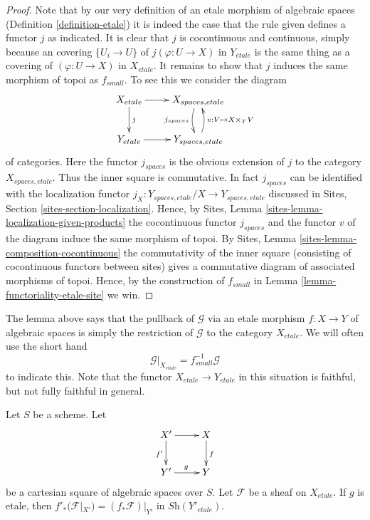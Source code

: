 \begin{proof}
Note that by our very definition of an etale morphism of algebraic spaces
(Definition \ref{definition-etale}) it is
indeed the case that the rule given defines a functor $j$ as indicated.
It is clear that $j$ is cocontinuous and continuous, simply because an
covering $\{U_i \to U\}$ of $j(\varphi : U \to X)$ in $Y_{etale}$ is the
same thing as a covering of $(\varphi : U \to X)$ in $X_{etale}$. It
remains to show that $j$ induces the same morphism of topoi as $f_{small}$.
To see this we consider the diagram
$$
\xymatrix{
X_{etale} \ar[r] \ar[d]^j &
X_{spaces, etale} \ar@/_/[d]_{j_{spaces}} \\
Y_{etale} \ar[r] &
Y_{spaces, etale} \ar@/_/[u]_{v : V \mapsto X \times_Y V}
}
$$
of categories. Here the functor $j_{spaces}$ is the obvious extension of $j$
to the category $X_{spaces, etale}$. Thus the inner square is commutative.
In fact $j_{spaces}$ can be identified with the
localization functor $j_X : Y_{spaces, etale}/X \to Y_{spaces, etale}$
discussed in
Sites, Section \ref{sites-section-localization}.
Hence, by
Sites, Lemma \ref{sites-lemma-localization-given-products}
the cocontinuous functor $j_{spaces}$ and the functor $v$ of the diagram
induce the same morphism of topoi. By
Sites, Lemma \ref{sites-lemma-composition-cocontinuous}
the commutativity of the inner square (consisting of cocontinuous functors
between sites) gives a commutative diagram of associated morphisms of topoi.
Hence, by the construction of $f_{small}$ in
Lemma \ref{lemma-functoriality-etale-site} we win.
\end{proof}

\noindent
The lemma above says that the pullback of $\mathcal{G}$ via an etale morphism
$f : X \to Y$ of algebraic spaces is simply the restriction of $\mathcal{G}$
to the category $X_{etale}$. We will often use the short hand
\begin{equation}
\label{equation-restrict}
\mathcal{G}|_{X_{etale}} = f_{small}^{-1}\mathcal{G}
\end{equation}
to indicate this. Note that the functor $X_{etale} \to Y_{etale}$
in this situation is faithful, but not fully faithful in general.

\begin{lemma}
\label{lemma-pushforward-etale-base-change}
Let $S$ be a scheme. Let
$$
\xymatrix{
X' \ar[r] \ar[d]_{f'} & X \ar[d]^f \\
Y' \ar[r]^g & Y
}
$$
be a cartesian square of algebraic spaces over $S$. Let
$\mathcal{F}$ be a sheaf on $X_{etale}$. If $g$ is etale, then
$f'_*(\mathcal{F}|_{X'}) = (f_*\mathcal{F})|_{Y'}$ in
$\textit{Sh}(Y'_{etale})$.
\end{lemma}

